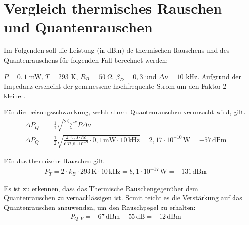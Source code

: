 
\section{Vergleich thermisches Rauschen und Quantenrauschen}

Im Folgenden soll die Leistung (in dBm) de thermischen Rauschens und des Quantenrauschens für folgenden Fall berechnet werden:

$P = 0,1$ mW, $T = 293$ K, $R_D = 50\, \Omega$, $\beta_D = 0,3$ und $\Delta \nu = 10$ kHz. Aufgrund der Impedanz erscheint der gemmessene hochfrequente Strom um den Faktor 2 kleiner.

Für die Leisungsschwankung, welch durch Quantenrauschen verursacht wird, gilt:
\begin{align}
    \Delta P_Q &= \frac{1}{2} \sqrt{\frac{2\beta_D h c}{\lambda}P \Delta \nu}\\
    \Delta P_Q &= \frac{1}{2} \sqrt{\frac{2 \cdot 0,3\cdot h c}{632,8 \cdot 10^{-9}} \cdot 0,1\, \text{mW} \cdot 10 \, \text{kHz}} = 2,17 \cdot 10^{-10}\, \text{W} = -67\, \text{dBm}
\end{align}

Für das thermische Rauschen gilt:
\begin{gather}
    P_T = 2 \cdot k_B \cdot 293\,\text{K} \cdot 10\,\text{kHz} = 8,1 \cdot 10^{-17}\, \text{W} = -131 \, \text{dBm}
\end{gather}

Es ist zu erkennen, dass das Thermische Rauschengegenüber dem Quantenrauschen zu vernachlässigen ist.
Somit reicht es die Verstärkung auf das Quantenrauschen anzuwenden, um den Rauschpegel zu erhalten:
\begin{gather}
    P_{Q,V} = -67 \, \text{dBm} + 55\, \text{dB} = -12 \, \text{dBm}
\end{gather}